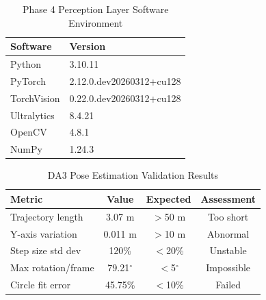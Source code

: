 \begin{table}[htbp]
\centering
\caption{Phase 4 Perception Layer Software Environment}
\label{tab:phase4_software}
\begin{tabular}{@{}ll@{}}
\toprule
\textbf{Software} & \textbf{Version} \\
\midrule
Python & 3.10.11 \\
PyTorch & 2.12.0.dev20260312+cu128 \\
TorchVision & 0.22.0.dev20260312+cu128 \\
Ultralytics & 8.4.21 \\
OpenCV & 4.8.1 \\
NumPy & 1.24.3 \\
\bottomrule
\end{tabular}
\end{table}

\begin{table}[htbp]
\centering
\caption{DA3 Pose Estimation Validation Results}
\label{tab:da3_pose_validation}
\begin{tabular}{@{}lccc@{}}
\toprule
\textbf{Metric} & \textbf{Value} & \textbf{Expected} & \textbf{Assessment} \\
\midrule
Trajectory length & 3.07 m & $>$50 m & Too short \\
Y-axis variation & 0.011 m & $>$10 m & Abnormal \\
Step size std dev & 120\% & $<$20\% & Unstable \\
Max rotation/frame & 79.21$^\circ$ & $<$5$^\circ$ & Impossible \\
Circle fit error & 45.75\% & $<$10\% & Failed \\
\bottomrule
\end{tabular}
\end{table}
